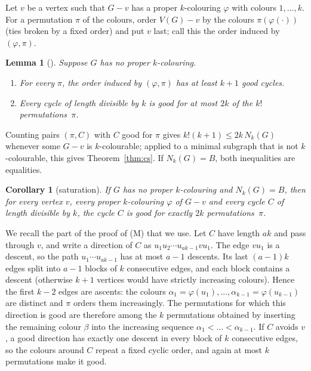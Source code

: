 \documentclass[11pt]{article}
\newtheorem{lemma}{Lemma}
\newtheorem{corollary}{Corollary}
\theoremstyle{remark}
\begin{document}
Let $v$ be a vertex such that $G-v$ has a proper $k$-colouring $\varphi$ with
colours $1,\dots,k$. For a permutation $\pi$ of the colours, order $V(G)-v$ by
the colours $\pi(\varphi(\cdot))$ (ties broken by a fixed order) and put $v$
last; call this the order induced by $(\varphi,\pi)$.

\begin{lemma}[{\cite[Lemmas~5 and~6]{cs}}]\label{lem:om}
Suppose $G$ has no proper $k$-colouring.
\begin{enumerate}
\item[(O)] For every $\pi$, the order induced by $(\varphi,\pi)$ has at least
$k+1$ good cycles.
\item[(M)] Every cycle of length divisible by $k$ is good for at most $2k$ of the
$k!$ permutations~$\pi$.
\end{enumerate}
\end{lemma}

Counting pairs $(\pi,C)$ with $C$ good for $\pi$ gives
$k!(k+1)\le 2k\,N_k(G)$ whenever some $G-v$ is $k$-colourable; applied to a
minimal subgraph that is not $k$-colourable, this gives Theorem~\ref{thm:cs}. If $N_k(G)=B$, both
inequalities are equalities.

\begin{corollary}[saturation]\label{cor:sat}
If $G$ has no proper $k$-colouring and $N_k(G)=B$, then for every vertex $v$,
every proper $k$-colouring $\varphi$ of $G-v$ and every cycle $C$ of length
divisible by $k$, the cycle $C$ is good for exactly $2k$ permutations~$\pi$.
\end{corollary}

We recall the part of the proof of (M) that we use. Let $C$ have length $ak$ and
pass through $v$, and write a direction of $C$ as
$u_1u_2\cdots u_{ak-1}vu_1$. The edge $vu_1$ is a descent, so the path
$u_1\cdots u_{ak-1}$ has at most $a-1$ descents. Its last $(a-1)k$ edges split
into $a-1$ blocks of $k$ consecutive edges, and each block contains a descent
(otherwise $k+1$ vertices would have strictly increasing colours). Hence the
first $k-2$ edges are ascents: the colours
$\alpha_1=\varphi(u_1),\dots,\alpha_{k-1}=\varphi(u_{k-1})$ are distinct and
$\pi$ orders them increasingly. The permutations for which this direction is
good are therefore among the $k$ permutations obtained by inserting the
remaining colour $\beta$ into the increasing sequence
$\alpha_1<\dots<\alpha_{k-1}$. If $C$ avoids $v$, a good direction has exactly
one descent in every block of $k$ consecutive edges, so the colours around $C$
repeat a fixed cyclic order, and again at most $k$ permutations make it good.
\end{document}
